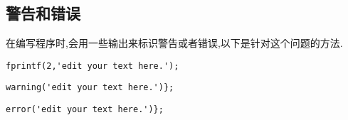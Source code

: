 \subsection{警告和错误}
在编写程序时,会用一些输出来标识警告或者错误,以下是针对这个问题的方法.

\vspace{-0.8cm}
\begin{lstlisting}[caption = 红色字符串输出]
  fprintf(2,'edit your text here.');
\end{lstlisting}


\vspace{-0.8cm}
\begin{lstlisting}[caption = 警告输出]
  warning('edit your text here.')};
\end{lstlisting}

\vspace{-0.8cm}
\begin{lstlisting}[caption = 错误输出]
  error('edit your text here.')};
\end{lstlisting}